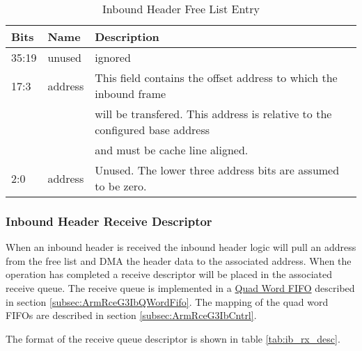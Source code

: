 \documentclass[11pt]{article}
\begin{document}
\begin{table}[H]
\small
\centering
   \begin{tabular}{| l | l | l | } 
      \hline \textbf{Bits} & \textbf{Name} & \textbf{Description} \\
      \hline 35:19         & unused        & ignored \\
      \hline 17:3          & address       & This field contains the offset address to which the inbound frame \\
                           &               & will be transfered. This address is relative to the configured base address  \\
                           &               & and must be cache line aligned.                                              \\
      \hline 2:0           & address       & Unused. The lower three address bits are assumed to be zero.               \\
      \hline
   \end{tabular}
   \caption{Inbound Header Free List Entry}
   \label{tab:ib_rx_flist}
\end{table}

\subsubsection{Inbound Header Receive Descriptor}

When an inbound header is received the inbound header logic will pull an address from the free list and DMA the header data to the associated address. 
When the operation has completed a receive descriptor will be placed in the associated receive queue. 
The receive queue is implemented in a \hyperref[subsec:ArmRceG3IbQWordFifo]{Quad Word FIFO} described in section \ref{subsec:ArmRceG3IbQWordFifo}. 
The mapping of the quad word FIFOs are described in section \ref{subsec:ArmRceG3IbCntrl}.

The format of the receive queue descriptor is shown in table \ref{tab:ib_rx_desc}.
\end{document}
